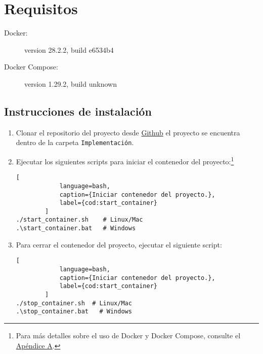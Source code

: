 	\section{Requisitos}
	\label{sec:requisitos-sistema}

	\begin{description}
		\item[Docker:] version 28.2.2, build e6534b4
		\item[Docker Compose:] version 1.29.2, build unknown
	\end{description}

	\subsection{Instrucciones de instalaci\'on}
	\label{sec:instalacion}

	\begin{enumerate}
		\item Clonar el repositorio del proyecto desde \href{https://github.com/Ic3manMtz/Servicio-Social.git}{Github} el proyecto se encuentra dentro de la carpeta \texttt{Implementaci\'on}.
		
		\item Ejecutar los siguientes scripts para iniciar el contenedor del proyecto:\footnote{Para más detalles sobre el uso de Docker y Docker Compose, consulte el \hyperref[anexo:docker]{Apéndice A}.}
		\begin{lstlisting}[
			language=bash,
			caption={Iniciar contenedor del proyecto.},
			label={cod:start_container}
		]
./start_container.sh	# Linux/Mac
.\start_container.bat	# Windows
		\end{lstlisting}

		\item Para cerrar el contenedor del proyecto, ejecutar el siguiente script:
		\begin{lstlisting}[
			language=bash,
			caption={Iniciar contenedor del proyecto.},
			label={cod:start_container}
		]
./stop_container.sh  # Linux/Mac
.\stop_container.bat   # Windows
		\end{lstlisting}
	\end{enumerate}